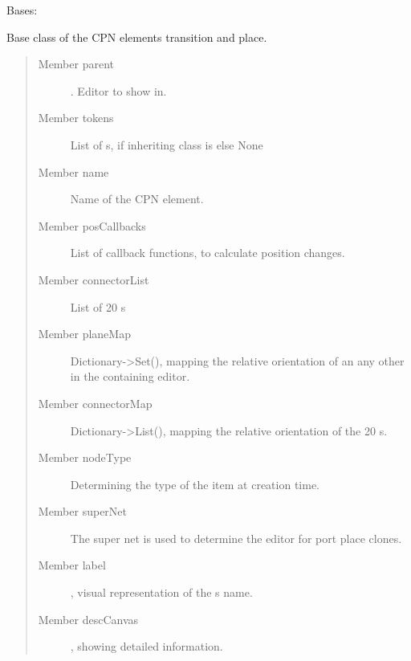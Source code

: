 \documentclass[a4paper,10pt,english]{sphinxmanual}
\begin{document}
\begin{fulllineitems}
\label{model_link:model.AbstractItem.AbstractItem}
Bases: 

Base class of the CPN elements transition and place.
\begin{quote}\begin{description}
\item[{Member parent}] \leavevmode
{}. Editor to show in.

\item[{Member tokens}] \leavevmode
List of  s, if inheriting class is  else None

\item[{Member name}] \leavevmode
Name of the CPN element.

\item[{Member posCallbacks}] \leavevmode
List of callback functions, to calculate position changes.

\item[{Member connectorList}] \leavevmode
List of 20  s

\item[{Member planeMap}] \leavevmode
Dictionary-\textgreater{}Set(), mapping the relative orientation of an any other  in the containing editor.

\item[{Member connectorMap}] \leavevmode
Dictionary-\textgreater{}List(), mapping the relative orientation of the 20  s.

\item[{Member nodeType}] \leavevmode
Determining the type of the item at creation time.

\item[{Member superNet}] \leavevmode
The super net is used to determine the editor for port place clones.

\item[{Member label}] \leavevmode
{}, visual representation of the  s name.

\item[{Member descCanvas}] \leavevmode
{}, showing detailed information.


\end{description}
\end{quote}
\end{fulllineitems}
\end{document}
